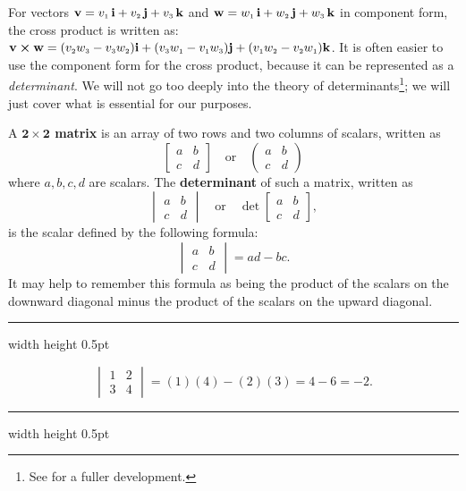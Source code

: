 For vectors $\mathbf{v} = v_{\scriptscriptstyle 1}\,\textbf{i} + v_{\scriptscriptstyle 2}\,\textbf{j} + v_{\scriptscriptstyle 3}\,\textbf{k}$ and $\mathbf{w} = w_{\scriptscriptstyle 1}\,\textbf{i} + w_{\scriptscriptstyle 2}\,\textbf{j} + w_{\scriptscriptstyle 3}\,\textbf{k}$ in component form, the cross
product is written as: $\mathbf{v} \bm{\times} \mathbf{w} = (v_{\scriptscriptstyle 2}w_{\scriptscriptstyle 3} -
v_{\scriptscriptstyle 3}w_{\scriptscriptstyle 2})\mathbf{i} + (v_{\scriptscriptstyle 3}w_{\scriptscriptstyle 1} - v_{\scriptscriptstyle 1}w_{\scriptscriptstyle 3})\mathbf{j} +
(v_{\scriptscriptstyle 1}w_{\scriptscriptstyle 2} - v_{\scriptscriptstyle 2}w_{\scriptscriptstyle 1})\mathbf{k}$.
It is often easier to use the component form for the cross product, because it can be represented as a
\emph{determinant}. We will not go too deeply into the theory of determinants\footnote{See \cite{ar}
for a fuller development.}; we will just cover what is essential for our purposes.

A \textbf{$\bm{2 \times 2}$ matrix} is an array of two rows and two columns of scalars, written as
\begin{displaymath}
 \begin{bmatrix}
  a & b\\
  c & d
 \end{bmatrix}
 \quad\text{or}\quad
 \begin{pmatrix}
  a & b\\
  c & d
 \end{pmatrix}
\end{displaymath}
where $a, b, c, d$ are scalars. 
The \textbf{determinant} of such a matrix, written as
\begin{displaymath}
 \begin{vmatrix}
  a & b\\
  c & d
 \end{vmatrix}
 \quad\text{or}\quad
 \det \begin{bmatrix}
  a & b\\
  c & d
 \end{bmatrix},
\end{displaymath}
is the scalar defined by the following formula:
\begin{displaymath}
 \begin{vmatrix}
  a & b\\
  c & d
 \end{vmatrix}
 = ad - bc.
\end{displaymath}
It may help to remember this formula as being the product of the scalars on the downward diagonal minus the product of
the scalars on the upward diagonal.

\medskip
\hrule width \textwidth height 0.5pt
\begin{exmp}
 \begin{displaymath}
  \begin{vmatrix}
   1 & 2\\
   3 & 4
  \end{vmatrix}
  = (1)(4) - (2)(3) = 4 - 6 = -2.
 \end{displaymath}
\end{exmp}
\hrule width \textwidth height 0.5pt
\medskip


